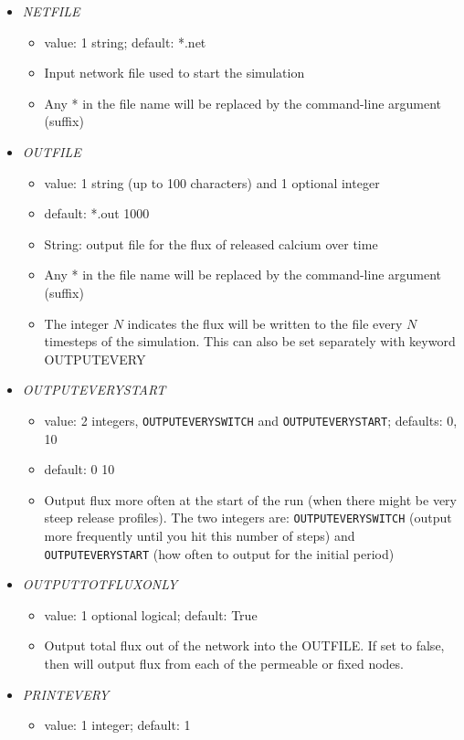 \documentclass[12pt]{article}
\begin{document}
\begin{itemize}
%
\item {\it NETFILE}
\begin{itemize}
	\item  value: 1 string; default: *.net
	\item Input network file used to start the simulation
	 \item Any * in the file name will be replaced by the command-line argument (suffix)
\end{itemize}
%
\item {\it OUTFILE}
    \begin{itemize}
      \item  value: 1 string (up to 100 characters) and 1 optional integer
      \item  default: *.out 1000
      \item String: output file for the flux of released calcium over time      
      \item Any * in the file name will be replaced by the command-line argument (suffix)
      \item The integer $N$ indicates the flux will be written to the file every $N$ timesteps of the simulation. This can also be set separately with keyword OUTPUTEVERY
      \end{itemize}
%
\item {\it OUTPUTEVERYSTART}
\begin{itemize}
	\item  value: 2 integers, \verb=OUTPUTEVERYSWITCH= and \verb=OUTPUTEVERYSTART=; defaults: 0, 10
	\item  default: 0 10
	\item Output flux more often at the start of the run (when there might be very steep release profiles). The two integers are: \verb=OUTPUTEVERYSWITCH= (output more frequently until you hit this number of steps) and \verb=OUTPUTEVERYSTART= (how often to output for the initial period)
\end{itemize}
%
\item {\it OUTPUTTOTFLUXONLY}
\begin{itemize}
	\item  value: 1 optional logical; default: True
	\item Output total flux out of the network into the OUTFILE. If set to false, then will output flux from each of the permeable or fixed nodes.
\end{itemize}
%
\item {\it PRINTEVERY}
\begin{itemize}
	\item  value: 1 integer; default: 1

\end{itemize}
\end{itemize}
\end{document}
